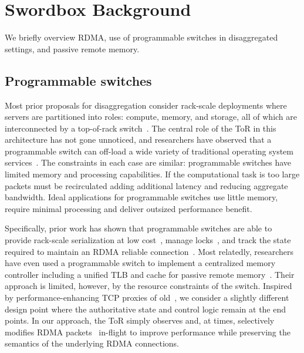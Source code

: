 \documentclass[12pt]{ucsddissertation}
\begin{document}
\section{Swordbox Background}

We briefly overview RDMA, use of
programmable switches in disaggregated settings, and passive remote
memory.




\subsection{Programmable switches}



Most prior proposals for
disaggregation consider rack-scale deployments where
servers are partitioned into roles: compute, memory, and storage, all
of which are interconnected by a top-of-rack
switch~\cite{disandapp,the-machine,intel-rack,firebox,legoos}.  The central
role of the ToR in this architecture has not gone unnoticed, and
researchers have observed that a programmable switch can off-load a
wide variety of traditional operating system
services~\cite{disandapp,mind,netlock,netkv,netchain,netcache}. The
constraints in each case are similar: programmable switches have
limited memory and processing capabilities.  If the computational task
is too large packets must be recirculated adding
additional latency and reducing aggregate bandwidth.  Ideal
applications for programmable switches use little memory, require
minimal processing and deliver outsized performance benefit.

Specifically, prior work has shown that programmable switches are able
to provide rack-scale serialization at low
cost~\cite{eris,no,when-computer,Grant2021InContRes}, manage
locks~\cite{netlock}, and track the state required to maintain an
RDMA reliable connection~\cite{tea}.  Most relatedly, researchers have
even used a programmable switch to implement a centralized memory
controller including a unified TLB and cache for passive remote
memory~\cite{mind}.  Their approach is limited, however, by the
resource constraints of the switch.  Inspired by performance-enhancing
TCP proxies of old~\cite{snoop,rfc3135}, we consider a slightly
different design point where the authoritative state and control logic
remain at the end points.  In our approach, the ToR simply observes
and, at times, selectively modifies RDMA
packets~\cite{switchml,Grant2021InContRes} in-flight to improve
performance while preserving the semantics of the underlying RDMA
connections.
\end{document}
